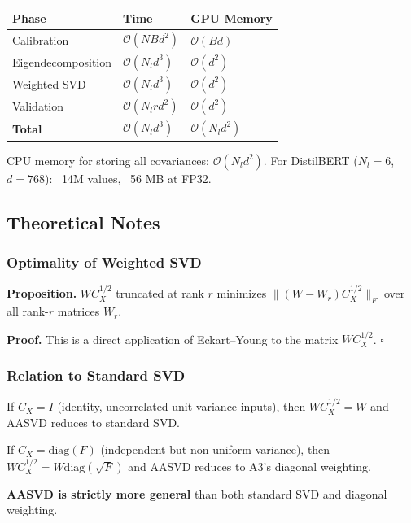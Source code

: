 \begin{table}[H]
\centering
\small
\begin{tabular}{lll}
\toprule
\textbf{Phase} & \textbf{Time} & \textbf{GPU Memory} \\
\midrule
Calibration & $\mathcal{O}(N B d^2)$ & $\mathcal{O}(B d)$ \\
Eigendecomposition & $\mathcal{O}(N_l d^3)$ & $\mathcal{O}(d^2)$ \\
Weighted SVD & $\mathcal{O}(N_l d^3)$ & $\mathcal{O}(d^2)$ \\
Validation & $\mathcal{O}(N_l r d^2)$ & $\mathcal{O}(d^2)$ \\
\textbf{Total} & $\mathcal{O}(N_l d^3)$ & $\mathcal{O}(N_l d^2)$ \\
\bottomrule
\end{tabular}
\end{table}

CPU memory for storing all covariances: $\mathcal{O}(N_l d^2)$. For 
DistilBERT ($N_l = 6$, $d = 768$): ~14M values, ~56 MB at FP32.

\subsection{Theoretical Notes}

\subsubsection{Optimality of Weighted SVD}

\textbf{Proposition.} $W C_X^{1/2}$ truncated at rank $r$ minimizes $\|(W - W_r) C_X^{1/2}\|_F$ 
over all rank-$r$ matrices $W_r$.

\textbf{Proof.} This is a direct application of Eckart--Young to the matrix 
$W C_X^{1/2}$. $\square$

\subsubsection{Relation to Standard SVD}

If $C_X = I$ (identity, uncorrelated unit-variance inputs), then 
$W C_X^{1/2} = W$ and AASVD reduces to standard SVD.

If $C_X = \mathrm{diag}(F)$ (independent but non-uniform variance), then 
$W C_X^{1/2} = W \mathrm{diag}(\sqrt{F})$ and AASVD reduces to A3's 
diagonal weighting.

\textbf{AASVD is strictly more general} than both standard SVD and diagonal 
weighting.

